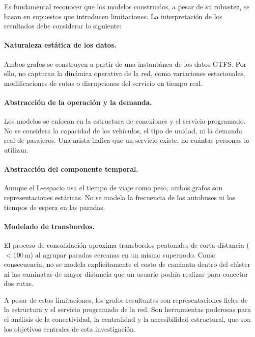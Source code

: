         Es fundamental reconocer que los modelos construidos, a pesar de su robustez, se basan en supuestos que introducen limitaciones. La interpretación de los resultados debe considerar lo siguiente:
        
        \paragraph{Naturaleza estática de los datos.} Ambos grafos se construyen a partir de una instantánea de los datos GTFS. Por ello, no capturan la dinámica operativa de la red, como variaciones estacionales, modificaciones de rutas o disrupciones del servicio en tiempo real.
        
        \paragraph{Abstracción de la operación y la demanda.} Los modelos se enfocan en la estructura de conexiones y el servicio programado. No se considera la capacidad de los vehículos, el tipo de unidad, ni la demanda real de pasajeros. Una arista indica que un servicio existe, no cuántas personas lo utilizan.
        
        \paragraph{Abstracción del componente temporal.} Aunque el L-espacio usa el tiempo de viaje como peso, ambos grafos son representaciones estáticas. No se modela la frecuencia de los autobuses ni los tiempos de espera en las paradas.
        
        \paragraph{Modelado de transbordos.} El proceso de consolidación aproxima transbordos peatonales de corta distancia ($<100\,\text{m}$) al agrupar paradas cercanas en un mismo supernodo. Como consecuencia, no se modela explícitamente el costo de caminata dentro del clúster ni las caminatas de mayor distancia que un usuario podría realizar para conectar dos rutas.
        
        A pesar de estas limitaciones, los grafos resultantes son representaciones fieles de la estructura y el servicio programado de la red. Son herramientas poderosas para el análisis de la conectividad, la centralidad y la accesibilidad estructural, que son los objetivos centrales de esta investigación.
